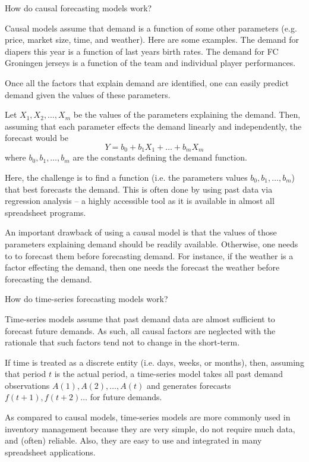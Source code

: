 \begin{question}
How do causal forecasting models work?

\end{question}

  \begin{solution}
    Causal models assume that demand is a function of some other parameters (e.g. price, market size, time, and weather). Here are some examples. The demand for diapers this year is a function of last years birth rates. The demand for FC Groningen jerseys is a function of the team and individual player performances. 

Once all the factors that explain demand are identified, one can easily predict demand given the values of these parameters. 

Let $X_1,X_2,\ldots,X_m$ be the values of the parameters explaining the demand. Then, assuming that each parameter effects the demand linearly and independently, the forecast would be 
\begin{equation*}
Y = b_0 + b_1 X_1 + \ldots + b_m X_m
\end{equation*}
where $b_0,b_1,\ldots,b_m$ are the constants defining the demand function. 

Here, the challenge is to find a function (i.e. the parameters values $b_0,b_1,\ldots,b_m$) that best forecasts the demand. This is often done by using past data via regression analysis -- a highly accessible tool as it is available in almost all spreadsheet programs. 

An important drawback of using a causal model is that the values of those parameters explaining demand should be readily available. Otherwise, one needs to to forecast them before forecasting demand. For instance, if the weather is a factor effecting the demand, then one needs the forecast the weather before forecasting the demand.    

  \end{solution}


\begin{question}
How do time-series forecasting models work?

\end{question}

  \begin{solution}
Time-series models assume that past demand data are almost sufficient to forecast future demands. As such, all causal factors are neglected with the rationale that such factors tend not to change in the short-term. 

If time is treated as a discrete entity (i.e. days, weeks, or months), then, assuming that period $t$ is the actual period, a time-series model takes all past demand observations $A(1),A(2),\ldots,A(t)$ and generates forecasts $f(t+1),f(t+2)\ldots$ for future demands. 

As compared to causal models, time-series models are more commonly used in inventory management because they are very simple, do not require much data, and (often) reliable. Also, they are easy to use and integrated in many spreadsheet applications.
  \end{solution}


